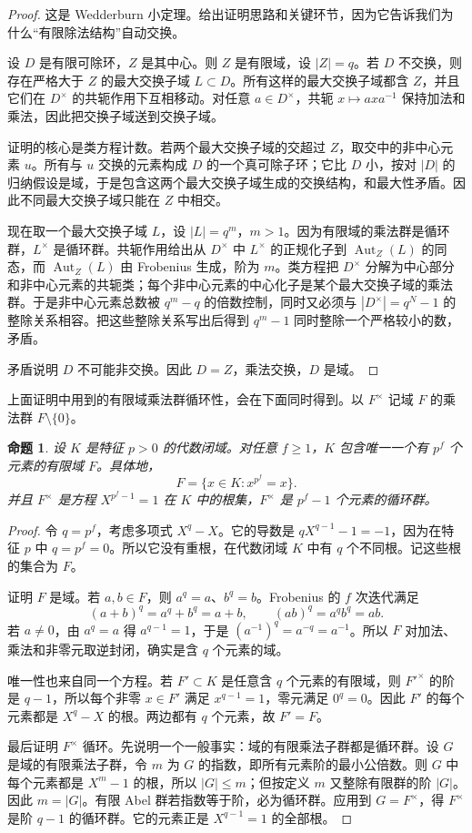 \documentclass[11pt,a4paper,openany]{ctexbook}
\numberwithin{equation}{chapter}
\theoremstyle{plain}
\newtheorem{proposition}[theorem]{命题}
\theoremstyle{definition}
\theoremstyle{remark}
\begin{document}
\begin{proof}
这是 Wedderburn 小定理。给出证明思路和关键环节，因为它告诉我们为什么“有限除法结构”自动交换。

设 $D$ 是有限可除环，$Z$ 是其中心。则 $Z$ 是有限域，设 $|Z|=q$。若 $D$ 不交换，则存在严格大于 $Z$ 的最大交换子域 $L\subset D$。所有这样的最大交换子域都含 $Z$，并且它们在 $D^\times$ 的共轭作用下互相移动。对任意 $a\in D^\times$，共轭 $x\mapsto axa^{-1}$ 保持加法和乘法，因此把交换子域送到交换子域。

证明的核心是类方程计数。若两个最大交换子域的交超过 $Z$，取交中的非中心元素 $u$。所有与 $u$ 交换的元素构成 $D$ 的一个真可除子环；它比 $D$ 小，按对 $|D|$ 的归纳假设是域，于是包含这两个最大交换子域生成的交换结构，和最大性矛盾。因此不同最大交换子域只能在 $Z$ 中相交。

现在取一个最大交换子域 $L$，设 $|L|=q^m$，$m>1$。因为有限域的乘法群是循环群，$L^\times$ 是循环群。共轭作用给出从 $D^\times$ 中 $L^\times$ 的正规化子到 $\operatorname{Aut}_Z(L)$ 的同态，而 $\operatorname{Aut}_Z(L)$ 由 Frobenius 生成，阶为 $m$。类方程把 $D^\times$ 分解为中心部分和非中心元素的共轭类；每个非中心元素的中心化子是某个最大交换子域的乘法群。于是非中心元素总数被 $q^m-q$ 的倍数控制，同时又必须与 $|D^\times|=q^N-1$ 的整除关系相容。把这些整除关系写出后得到 $q^m-1$ 同时整除一个严格较小的数，矛盾。

矛盾说明 $D$ 不可能非交换。因此 $D=Z$，乘法交换，$D$ 是域。
\end{proof}

上面证明中用到的有限域乘法群循环性，会在下面同时得到。以 $F^\times$ 记域 $F$ 的乘法群 $F\setminus\{0\}$。

\begin{proposition}
设 $K$ 是特征 $p>0$ 的代数闭域。对任意 $f\ge1$，$K$ 包含唯一一个有 $p^f$ 个元素的有限域 $F$。具体地，
\[
F=\{x\in K:x^{p^f}=x\}.
\]
并且 $F^\times$ 是方程 $X^{p^f-1}=1$ 在 $K$ 中的根集，$F^\times$ 是 $p^f-1$ 个元素的循环群。
\end{proposition}

\begin{proof}
令 $q=p^f$，考虑多项式 $X^q-X$。它的导数是 $qX^{q-1}-1=-1$，因为在特征 $p$ 中 $q=p^f=0$。所以它没有重根，在代数闭域 $K$ 中有 $q$ 个不同根。记这些根的集合为 $F$。

证明 $F$ 是域。若 $a,b\in F$，则 $a^q=a$、$b^q=b$。Frobenius 的 $f$ 次迭代满足
\[
(a+b)^q=a^q+b^q=a+b,\qquad
(ab)^q=a^qb^q=ab.
\]
若 $a\ne0$，由 $a^q=a$ 得 $a^{q-1}=1$，于是 $(a^{-1})^q=a^{-q}=a^{-1}$。所以 $F$ 对加法、乘法和非零元取逆封闭，确实是含 $q$ 个元素的域。

唯一性也来自同一个方程。若 $F'\subset K$ 是任意含 $q$ 个元素的有限域，则 $F'^\times$ 的阶是 $q-1$，所以每个非零 $x\in F'$ 满足 $x^{q-1}=1$，零元满足 $0^q=0$。因此 $F'$ 的每个元素都是 $X^q-X$ 的根。两边都有 $q$ 个元素，故 $F'=F$。

最后证明 $F^\times$ 循环。先说明一个一般事实：域的有限乘法子群都是循环群。设 $G$ 是域的有限乘法子群，令 $m$ 为 $G$ 的指数，即所有元素阶的最小公倍数。则 $G$ 中每个元素都是 $X^m-1$ 的根，所以 $|G|\le m$；但按定义 $m$ 又整除有限群的阶 $|G|$。因此 $m=|G|$。有限 Abel 群若指数等于阶，必为循环群。应用到 $G=F^\times$，得 $F^\times$ 是阶 $q-1$ 的循环群。它的元素正是 $X^{q-1}=1$ 的全部根。
\end{proof}
\end{document}

